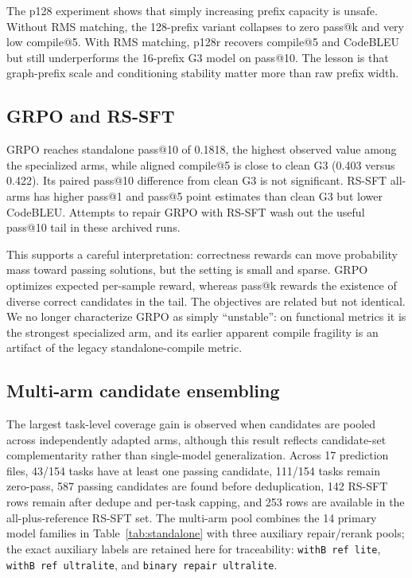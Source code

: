 \documentclass[11pt]{article}
\begin{document}
The p128 experiment shows that simply increasing prefix capacity is unsafe. Without RMS matching, the 128-prefix variant collapses to zero pass@k and very low compile@5. With RMS matching, p128r recovers compile@5 and CodeBLEU but still underperforms the 16-prefix G3 model on pass@10. The lesson is that graph-prefix scale and conditioning stability matter more than raw prefix width.

\subsection{GRPO and RS-SFT}

GRPO reaches standalone pass@10 of 0.1818, the highest observed value among the specialized arms, while aligned compile@5 is close to clean G3 (0.403 versus 0.422). Its paired pass@10 difference from clean G3 is not significant. RS-SFT all-arms has higher pass@1 and pass@5 point estimates than clean G3 but lower CodeBLEU. Attempts to repair GRPO with RS-SFT wash out the useful pass@10 tail in these archived runs.

This supports a careful interpretation: correctness rewards can move probability mass toward passing solutions, but the setting is small and sparse. GRPO optimizes expected per-sample reward, whereas pass@k rewards the existence of diverse correct candidates in the tail. The objectives are related but not identical. We no longer characterize GRPO as simply ``unstable'': on functional metrics it is the strongest specialized arm, and its earlier apparent compile fragility is an artifact of the legacy standalone-compile metric.

\subsection{Multi-arm candidate ensembling}
\label{sec:ensemble}

The largest task-level coverage gain is observed when candidates are pooled across independently adapted arms, although this result reflects candidate-set complementarity rather than single-model generalization. Across 17 prediction files, 43/154 tasks have at least one passing candidate, 111/154 tasks remain zero-pass, 587 passing candidates are found before deduplication, 142 RS-SFT rows remain after dedupe and per-task capping, and 253 rows are available in the all-plus-reference RS-SFT set. The multi-arm pool combines the 14 primary model families in Table~\ref{tab:standalone} with three auxiliary repair/rerank pools; the exact auxiliary labels are retained here for traceability: \texttt{withB ref lite}, \texttt{withB ref ultralite}, and \texttt{binary repair ultralite}.
\end{document}
